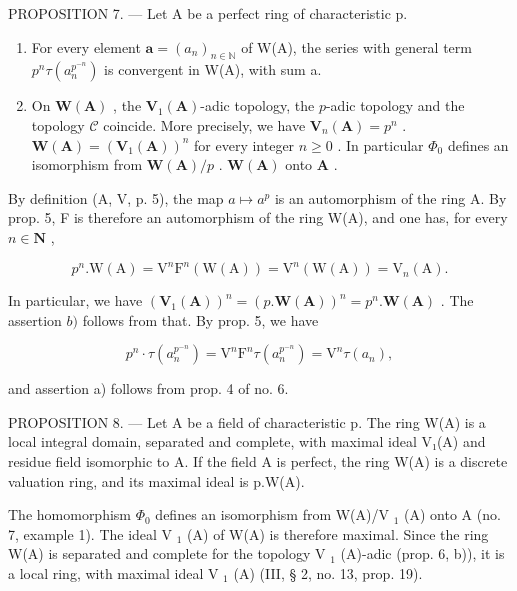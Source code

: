 PROPOSITION 7. --- Let A be a perfect ring of characteristic p.

\begin{enumerate}
\def\labelenumi{\alph{enumi})}
\item
  For every element \(\boldsymbol{a} = (a_{n})_{n \in \mathbb{N}}\) of W(A), the series with general term \(p^{n}\tau(a_{n}^{p^{-n}})\) is convergent in W(A), with sum a.
\item
  On \(\mathbf{W}(\mathbf{A})\) , the \(\mathbf{V}_1(\mathbf{A})\)-adic topology, the \(p\)-adic topology and the topology \(\mathcal{C}\) coincide. More precisely, we have \(\mathbf{V}_n(\mathbf{A}) = p^n\) . \(\mathbf{W}(\mathbf{A}) = (\mathbf{V}_1(\mathbf{A}))^n\) for every integer \(n \geqslant 0\) . In particular \(\Phi_0\) defines an isomorphism from \(\mathbf{W}(\mathbf{A})/p\) . \(\mathbf{W}(\mathbf{A})\) onto \(\mathbf{A}\) .
\end{enumerate}

By definition (A, V, p. 5), the map \(a \mapsto a^{p}\) is an automorphism of the ring A. By prop. 5, F is therefore an automorphism of the ring W(A), and one has, for every \(n \in \mathbf{N}\) ,

\[
p ^ {n}. \mathrm{W} (\mathrm{A}) = \mathrm{V} ^ {n} \mathrm{F} ^ {n} (\mathrm{W} (\mathrm{A})) = \mathrm{V} ^ {n} (\mathrm{W} (\mathrm{A})) = \mathrm{V} _ {n} (\mathrm{A}).
\]

In particular, we have \((\mathbf{V}_1(\mathbf{A}))^n = (p.\mathbf{W}(\mathbf{A}))^n = p^n.\mathbf{W}(\mathbf{A})\) . The assertion \(b)\) follows from that. By prop. 5, we have

\[
p ^ {n} \cdot \tau (a _ {n} ^ {p ^ {- n}}) = \mathrm{V} ^ {n} \mathrm{F} ^ {n} \tau (a _ {n} ^ {p ^ {- n}}) = \mathrm{V} ^ {n} \tau (a _ {n}),
\]

and assertion a) follows from prop. 4 of no. 6.

PROPOSITION 8. — Let A be a field of characteristic p. The ring W(A) is a local integral domain, separated and complete, with maximal ideal V₁(A) and residue field isomorphic to A. If the field A is perfect, the ring W(A) is a discrete valuation ring, and its maximal ideal is p.W(A).

The homomorphism \(\Phi_{0}\) defines an isomorphism from W(A)/V \(_{1}\) (A) onto A (no. 7, example 1). The ideal V \(_{1}\) (A) of W(A) is therefore maximal. Since the ring W(A) is separated and complete for the topology V \(_{1}\) (A)-adic (prop. 6, b)), it is a local ring, with maximal ideal V \(_{1}\) (A) (III, § 2, no. 13, prop. 19).

